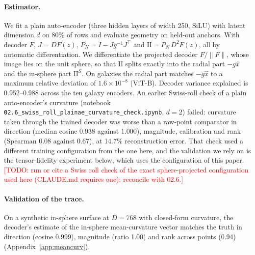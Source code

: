 \documentclass[10pt]{article}
\newcommand{\norm}[1]{\lVert #1 \rVert}
\newcommand{\II}{\mathrm{II}}
\newcommand{\todo}[1]{\textcolor{red}{[TODO: #1]}}
\begin{document}
\paragraph{Estimator.} We fit a plain auto-encoder (three hidden layers of width 250, SiLU) with latent dimension $d$ on 80\% of rows and evaluate geometry on held-out anchors. With decoder $F$, $J=DF(z)$, $P_N=I-Jg^{-1}J^\top$ and $\II=P_N\,D^2F(z)$, all by automatic differentiation. We differentiate the projected decoder $F/\norm{F}$, whose image lies on the unit sphere, so that $\II$ splits exactly into the radial part $-g\hat x$ and the in-sphere part $\II^S$. On galaxies the radial part matches $-g\hat x$ to a maximum relative deviation of $1.6\times10^{-8}$ (ViT-B). %
Decoder variance explained is 0.952--0.988 across the ten galaxy encoders. %
An earlier Swiss-roll check of a plain auto-encoder's curvature (notebook \texttt{02.6\_swiss\_roll\_plainae\_curvature\_check.ipynb}, $d=2$) failed: curvature taken through the trained decoder was worse than a raw-point comparator in direction (median cosine 0.938 against 1.000), magnitude, calibration and rank (Spearman 0.08 against 0.67), at 14.7\% reconstruction error. %
That check used a different training configuration from the one here, and the validation we rely on is the tensor-fidelity experiment below, which uses the configuration of this paper. \todo{run or cite a Swiss roll check of the exact sphere-projected configuration used here (CLAUDE.md requires one); reconcile with 02.6.}

\paragraph{Validation of the trace.} On a synthetic in-sphere surface at $D=768$ with closed-form curvature, the decoder's estimate of the in-sphere mean-curvature vector matches the truth in direction (cosine 0.999), magnitude (ratio 1.00) and rank across points (0.94) (Appendix~\ref{app:meancurv}). %
\end{document}
